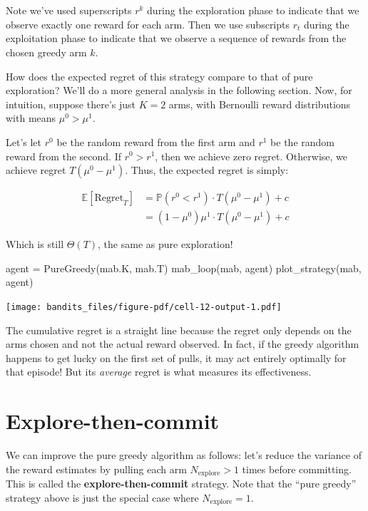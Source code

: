 \documentclass[
  letterpaper,
  DIV=11,
  numbers=noendperiod]{scrreprt}
\newenvironment{Shaded}{\begin{snugshade}}{\end{snugshade}}
\newcommand{\NormalTok}[1]{\textcolor[rgb]{0.00,0.23,0.31}{#1}}
\newcommand{\OperatorTok}[1]{\textcolor[rgb]{0.37,0.37,0.37}{#1}}
\theoremstyle{plain}
\theoremstyle{plain}
\theoremstyle{definition}
\theoremstyle{definition}
\theoremstyle{remark}
\begin{document}
Note we've used superscripts \(r^k\) during the exploration phase to
indicate that we observe exactly one reward for each arm. Then we use
subscripts \(r_t\) during the exploitation phase to indicate that we
observe a sequence of rewards from the chosen greedy arm \(\hat k\).

How does the expected regret of this strategy compare to that of pure
exploration? We'll do a more general analysis in the following section.
Now, for intuition, suppose there's just \(K=2\) arms, with Bernoulli
reward distributions with means \(\mu^0 > \mu^1\).

Let's let \(r^0\) be the random reward from the first arm and \(r^1\) be
the random reward from the second. If \(r^0 > r^1\), then we achieve
zero regret. Otherwise, we achieve regret \(T(\mu^0 - \mu^1)\). Thus,
the expected regret is simply:

\[
\begin{aligned}
    \mathbb{E}[\text{Regret}_T] &= \mathbb{P}(r^0 < r^1) \cdot T(\mu^0 - \mu^1) + c \\
    &= (1 - \mu^0) \mu^1 \cdot T(\mu^0 - \mu^1) + c
\end{aligned}
\]

Which is still \(\Theta(T)\), the same as pure exploration!

\begin{Shaded}
\begin{Highlighting}[]
\NormalTok{agent }\OperatorTok{=}\NormalTok{ PureGreedy(mab.K, mab.T)}
\NormalTok{mab\_loop(mab, agent)}
\NormalTok{plot\_strategy(mab, agent)}
\end{Highlighting}
\end{Shaded}

\texttt{[image: bandits\_files/figure-pdf/cell-12-output-1.pdf]}

The cumulative regret is a straight line because the regret only depends
on the arms chosen and not the actual reward observed. In fact, if the
greedy algorithm happens to get lucky on the first set of pulls, it may
act entirely optimally for that episode! But its \emph{average} regret
is what measures its effectiveness.

\section{Explore-then-commit}\label{sec-etc}

We can improve the pure greedy algorithm as follows: let's reduce the
variance of the reward estimates by pulling each arm
\(N_{\text{explore}}> 1\) times before committing. This is called the
\textbf{explore-then-commit} strategy. Note that the ``pure greedy''
strategy above is just the special case where \(N_{\text{explore}}= 1\).
\end{document}
